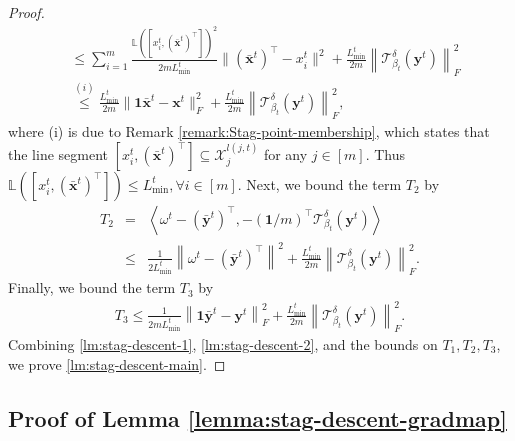\documentclass{article}
\newcommand{\cX}{\mathcal{X}}
\newcommand{\bL}{\mathbb{L}}
\newcommand{\ctdb}{\mathcal{T}^\delta_{\beta_t}}
\newcommand{\byt}{\mathbf{y}^t}
\newcommand{\xit}{x_{i}^{t}}
\newcommand{\bbxt}{\bar{\mathbf{x}}^t}
\newcommand{\bbyt}{\bar{\mathbf{y}}^t}
\newcommand{\bone}{\mathbf{1}}
\begin{document}
\begin{proof}
\begin{align*}
   &\leq \sum_{i=1}^m\frac{\bL([\xit,(\bbxt)^\top])^2}{2mL_{\min}^t}\|(\bar{\mathbf{x}}^t)^\top-x_i^t\|^2+ \frac{L_{\min}^t}{2m}\left\|\ctdb(\byt)\right\|_F^2\\
   &\overset{(i)}{\leq}\frac{L_{\text{min}}^t}{2m}\|\mathbf{1}\bar{\mathbf{x}}^t-\mathbf{x}^t\|^2_F+\frac{L^t_{\min}}{2m}\left\|\ctdb(\byt)\right\|^2_F,
\end{align*} 
where (i) is due to Remark \ref{remark:Stag-point-membership}, which states that the line segment $[\xit,(\bbxt)^\top]\subseteq\cX_j^{l(j,t)}$ for any $j\in[m]$. Thus $\bL([\xit,(\bbxt)^\top])\leq L^t_{\min}, \forall i\in[m]$. 
Next,  we bound the term $T_2$ by
\begin{eqnarray}
    T_2  &=&  \left \langle \omega^t - (\bbyt)^\top, - (\bone/m)^\top\ctdb(\byt)\right\rangle\nonumber\\
    &\leq& \frac{1}{2 L_{\min}^t}\left\|\omega^t-(\bbyt)^\top\right\|^2 + \frac{L_{\min}^t}{2m}\left\|\ctdb(\byt)\right\|^2_F. \nonumber
\end{eqnarray}
Finally, we bound the term $T_3$ by 
\begin{align*}
    T_3 \leq \frac{1}{2mL_{\min}^t}\left\|\bone\bbyt - \byt\right\|^2_F + \frac{L_{\min}^t}{2m}\left\|\ctdb(\byt)\right\|_F^2.
\end{align*}
Combining \eqref{lm:stag-descent-1}, \eqref{lm:stag-descent-2}, and the bounds on $T_1,T_2,T_3$, we prove \eqref{lm:stag-descent-main}.
\end{proof}

\subsection{Proof of Lemma \ref{lemma:stag-descent-gradmap}}
\label{appdx:lemma:stag-descent-gradmap}
\end{document}
